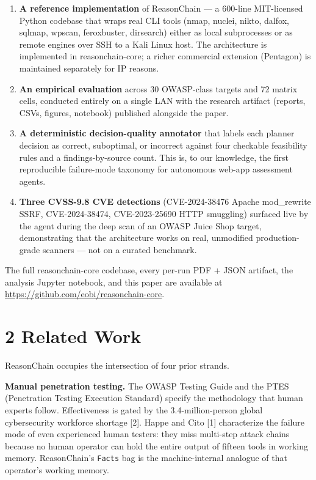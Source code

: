 \documentclass[
]{article}
\begin{document}
\begin{enumerate}
\def\labelenumi{\arabic{enumi}.}
\item
  \textbf{A reference implementation} of ReasonChain --- a 600-line
  MIT-licensed Python codebase that wraps real CLI tools (nmap, nuclei,
  nikto, dalfox, sqlmap, wpscan, feroxbuster, dirsearch) either as local
  subprocesses or as remote engines over SSH to a Kali Linux host. The
  architecture is implemented in reasonchain-core; a richer commercial
  extension (Pentagon) is maintained separately for IP reasons.
\item
  \textbf{An empirical evaluation} across 30 OWASP-class targets and 72
  matrix cells, conducted entirely on a single LAN with the research
  artifact (reports, CSVs, figures, notebook) published alongside the
  paper.
\item
  \textbf{A deterministic decision-quality annotator} that labels each
  planner decision as correct, suboptimal, or incorrect against four
  checkable feasibility rules and a findings-by-source count. This is,
  to our knowledge, the first reproducible failure-mode taxonomy for
  autonomous web-app assessment agents.
\item
  \textbf{Three CVSS-9.8 CVE detections} (CVE-2024-38476 Apache
  mod\_rewrite SSRF, CVE-2024-38474, CVE-2023-25690 HTTP smuggling)
  surfaced live by the agent during the deep scan of an OWASP Juice Shop
  target, demonstrating that the architecture works on real, unmodified
  production-grade scanners --- not on a curated benchmark.
\end{enumerate}

The full reasonchain-core codebase, every per-run PDF + JSON artifact,
the analysis Jupyter notebook, and this paper are available at
\url{https://github.com/eobi/reasonchain-core}.

\section{2 Related Work}\label{related-work}

ReasonChain occupies the intersection of four prior strands.

\textbf{Manual penetration testing.} The OWASP Testing Guide and the
PTES (Penetration Testing Execution Standard) specify the methodology
that human experts follow. Effectiveness is gated by the
3.4-million-person global cybersecurity workforce shortage {[}2{]}.
Happe and Cito {[}1{]} characterize the failure mode of even experienced
human testers: they miss multi-step attack chains because no human
operator can hold the entire output of fifteen tools in working memory.
ReasonChain's \texttt{Facts} bag is the machine-internal analogue of
that operator's working memory.
\end{document}

